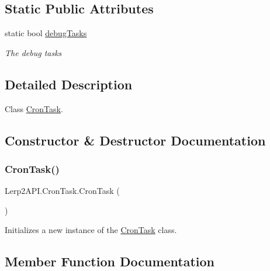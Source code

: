 \subsection*{Static Public Attributes}
\begin{DoxyCompactItemize}
\item 
static bool \hyperlink{class_lerp2_a_p_i_1_1_cron_task_a3d644a344616e7f4b5c9034369294db2}{debug\+Tasks}
\begin{DoxyCompactList}\small\item\em The debug tasks \end{DoxyCompactList}\end{DoxyCompactItemize}


\subsection{Detailed Description}
Class \hyperlink{class_lerp2_a_p_i_1_1_cron_task}{Cron\+Task}. 



\subsection{Constructor \& Destructor Documentation}
\mbox{\label{class_lerp2_a_p_i_1_1_cron_task_acfd4e6a51d2a3bd82513bd9ea7f1b10d}} 
\subsubsection{\texorpdfstring{Cron\+Task()}{CronTask()}}
{\footnotesize\ttfamily Lerp2\+A\+P\+I.\+Cron\+Task.\+Cron\+Task (\begin{DoxyParamCaption}{ }\end{DoxyParamCaption})\hspace{0.3cm}{\ttfamily [inline]}}



Initializes a new instance of the \hyperlink{class_lerp2_a_p_i_1_1_cron_task}{Cron\+Task} class. 



\subsection{Member Function Documentation}
\mbox{\label{class_lerp2_a_p_i_1_1_cron_task_afdac73f7e3ba9edf60723ede8e28cf29}} 
